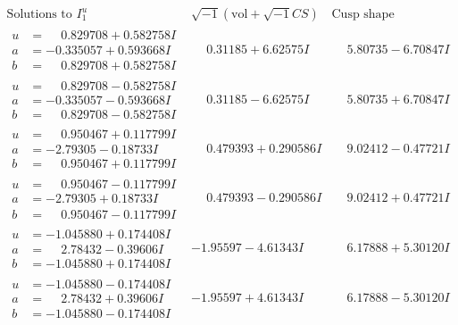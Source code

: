 \documentclass[1p]{elsarticle_modified}
\theoremstyle{definition}
\newcommand{\I}{\sqrt{-1}}
\begin{document}
$$\begin{array}{c|c|c}  
\text{Solutions to }I^u_{1}& \I (\text{vol} + \sqrt{-1}CS) & \text{Cusp shape}\\
 \hline 
\begin{aligned}
u &= \phantom{-}0.829708 + 0.582758 I \\
a &= -0.335057 + 0.593668 I \\
b &= \phantom{-}0.829708 + 0.582758 I\end{aligned}
 & \phantom{-}0.31185 + 6.62575 I & \phantom{-}5.80735 - 6.70847 I \\ \hline\begin{aligned}
u &= \phantom{-}0.829708 - 0.582758 I \\
a &= -0.335057 - 0.593668 I \\
b &= \phantom{-}0.829708 - 0.582758 I\end{aligned}
 & \phantom{-}0.31185 - 6.62575 I & \phantom{-}5.80735 + 6.70847 I \\ \hline\begin{aligned}
u &= \phantom{-}0.950467 + 0.117799 I \\
a &= -2.79305 - 0.18733 I \\
b &= \phantom{-}0.950467 + 0.117799 I\end{aligned}
 & \phantom{-}0.479393 + 0.290586 I & \phantom{-}9.02412 - 0.47721 I \\ \hline\begin{aligned}
u &= \phantom{-}0.950467 - 0.117799 I \\
a &= -2.79305 + 0.18733 I \\
b &= \phantom{-}0.950467 - 0.117799 I\end{aligned}
 & \phantom{-}0.479393 - 0.290586 I & \phantom{-}9.02412 + 0.47721 I \\ \hline\begin{aligned}
u &= -1.045880 + 0.174408 I \\
a &= \phantom{-}2.78432 - 0.39606 I \\
b &= -1.045880 + 0.174408 I\end{aligned}
 & -1.95597 - 4.61343 I & \phantom{-}6.17888 + 5.30120 I \\ \hline\begin{aligned}
u &= -1.045880 - 0.174408 I \\
a &= \phantom{-}2.78432 + 0.39606 I \\
b &= -1.045880 - 0.174408 I\end{aligned}
 & -1.95597 + 4.61343 I & \phantom{-}6.17888 - 5.30120 I \\ \hline\begin{aligned}

\end{aligned}
\end{array}$$
\end{document}
